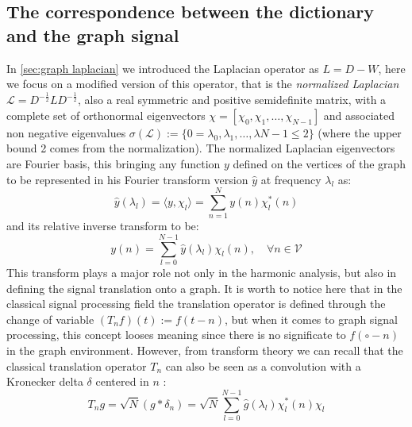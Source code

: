 \subsection{The correspondence between the dictionary and the graph signal}
In \ref{sec:graph laplacian} we introduced the Laplacian operator as $L = D - W$, here we focus on a modified version of this operator, that is the \textit{normalized Laplacian} $\mathcal{L} = D^{-\frac{1}{2}}LD^{-\frac{1}{2}}$, also a real symmetric and positive semidefinite matrix, with a complete set of orthonormal eigenvectors $\textbf{$\chi$} = [\chi_0,\chi_1,\dots,\chi_{N-1}]$ and associated non negative eigenvalues $\sigma(\mathcal{L}) := \{ 0 = \lambda_0,\lambda_1,\dots,\lambda{N-1} \leq 2 \}$ (where the upper bound 2 comes from the normalization).
The normalized Laplacian eigenvectors are Fourier basis, this bringing any function $y$ defined on the vertices of the graph to be represented in his Fourier transform version $\hat{y}$ at frequency $\lambda_l$ as:
\begin{equation}
\hat{y}(\lambda_l) = \langle y, \chi_l \rangle = \sum_{n=1}^{N} y(n)\chi_l^{*}(n)
\end{equation}
and its relative inverse transform to be:
\begin{equation}
y(n) = \sum_{l=0}^{N-1} \hat{y}(\lambda_l)\chi_l(n), \quad \forall n \in \mathcal{V}
\end{equation}
This transform plays a major role not only in the harmonic analysis, but also in defining the signal translation onto a graph. It is worth to notice here that in the classical signal processing field the translation operator is defined through the change of variable $(T_n f)(t) := f(t-n)$, but when it comes to graph signal processing, this concept looses meaning since there is no significate to $f(\circ - n)$ in the graph environment. However, from transform theory we can recall that the classical translation operator $T_n$ can also be seen as a convolution with a Kronecker delta $\delta$ centered in $n$\cite{Shuman2013} \cite{Thanou2014}:
\begin{equation}
T_n g = \sqrt{N}(g * \delta_n) = \sqrt{N}\sum_{l=0}^{N-1}\hat{g}(\lambda_l)\chi_l^{*}(n)\chi_l
\label{eq:translation}
\end{equation}

